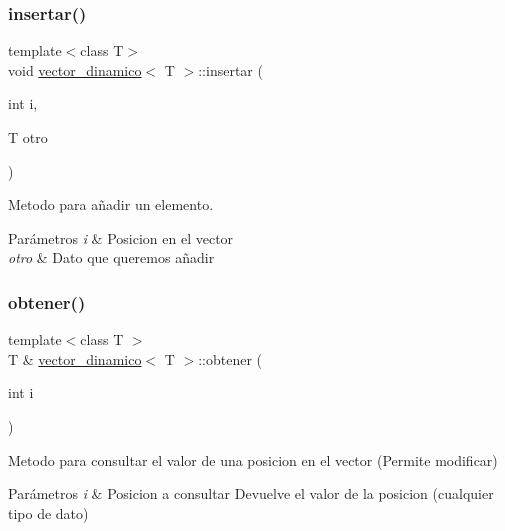 \subsubsection{\texorpdfstring{insertar()}{insertar()}}
{\footnotesize\ttfamily template$<$class T$>$ \\
void \hyperlink{classvector__dinamico}{vector\+\_\+dinamico}$<$ T $>$\+::insertar (\begin{DoxyParamCaption}\item[{int}]{i,  }\item[{T}]{otro }\end{DoxyParamCaption})}



Metodo para añadir un elemento. 


\begin{DoxyParams}{Parámetros}
{\em i} & Posicion en el vector \\
\hline
{\em otro} & Dato que queremos añadir \\
\hline
\end{DoxyParams}
\mbox{\label{classvector__dinamico_adfa7701af640b85c9c1642e54df903e4}} 
\subsubsection{\texorpdfstring{obtener()}{obtener()}}
{\footnotesize\ttfamily template$<$class T $>$ \\
T \& \hyperlink{classvector__dinamico}{vector\+\_\+dinamico}$<$ T $>$\+::obtener (\begin{DoxyParamCaption}\item[{int}]{i }\end{DoxyParamCaption})}



Metodo para consultar el valor de una posicion en el vector (Permite modificar) 


\begin{DoxyParams}{Parámetros}
{\em i} & Posicion a consultar  Devuelve el valor de la posicion (cualquier tipo de dato) \\
\hline
\end{DoxyParams}
\mbox{\label{classvector__dinamico_aa13f55271edd171d4dd4c203efb0c697}} 
